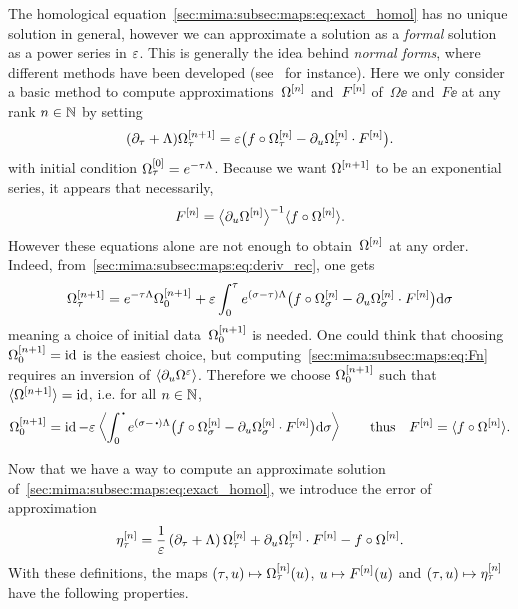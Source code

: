 The homological equation~\eqref{sec:mima:subsec:maps:eq:exact_homol} has 
no unique solution in general, however we can approximate a solution as a 
\textit{formal} solution as a power series in $\varepsilon$.
This is generally the idea behind \textit{normal forms}, where different 
methods have been developed (see~\cite{murdock.2006.normal} for instance). 
%
Here we only consider a basic method to compute approximations~$\Omega^{[n]}$ and~$F^{[n]}$ of~$\Omega\ee$ and~$F\ee$ at any rank $n \in \mathbb{N}$ by setting 
\begin{equation} \label{sec:mima:subsec:maps:eq:deriv_rec}
    (\partial_{\tau} + \Lambda) \Omega^{[n+1]}_{\tau} = \varepsilon \big( f\circ \Omega^{[n]}_{\tau} - \partial_{u} \Omega^{[n]}_{\tau} \cdot F^{[n]} \big) .
\end{equation}
with initial condition $\Omega^{[0]}_{\tau} = e^{-\tau \Lambda}$. 
%
Because we want $\Omega^{[n+1]}$ to be an exponential series, it appears that necessarily, 
\begin{equation} \label{sec:mima:subsec:maps:eq:Fn}
    F^{[n]} = \big\langle \partial_{u} \Omega^{[n]} \big\rangle ^{-1} 
    \langle f \circ \Omega^{[n]} \rangle .
\end{equation}
However these equations alone are not enough to obtain~$\Omega^{[n]}$ at any order. 
%
Indeed, from~\eqref{sec:mima:subsec:maps:eq:deriv_rec}, one gets 
\begin{equation} \label{sec:mima:subsec:maps:eq:rec}
    \Omega^{[n+1]}_{\tau} = e^{-\tau\Lambda} \Omega^{[n+1]}_0 
    + \varepsilon \int_0^{\tau} e^{(\sigma - \tau) \Lambda} \big( f\circ \Omega^{[n]}_{\sigma} - \partial_{u} \Omega^{[n]}_{\sigma} \cdot F^{[n]} \big) \mathrm{d}\sigma
\end{equation}
%
meaning a choice of initial data~$\Omega^{[n+1]}_0$ is needed. 
One could think that choosing $\Omega^{[n+1]}_0 = \operatorname{id}$ is the easiest choice, 
but computing~\eqref{sec:mima:subsec:maps:eq:Fn} requires an inversion of $\langle \partial_{u} \Omega^{\varepsilon} \rangle$. 
%
Therefore we choose $\Omega^{[n+1]}_0$ such that $\langle \Omega^{[n+1]} \rangle = \operatorname{id}$, 
i.e. for all $n \in \mathbb{N}$, 
\begin{equation} \label{sec:mima:subsec:maps:eq:Omega0}
  \Omega\rk{n+1}_0 = \id - \e \left\langle \int_0^{\,\bigcdot} e^{(\sigma - \,\bigcdot) \Lambda}
  \lp f\circ \Omega\rk{n}_{\sigma} - \dpu \Omega\rk{n}_{\sigma} \cdot F\rk{n} \rp \D\sigma \right\rangle
  \qquad\text{thus}\quad
  F\rk{n} = \langle f \circ \Omega\rk{n} \rangle . 
\end{equation}

Now that we have a way to compute an approximate solution 
of~\eqref{sec:mima:subsec:maps:eq:exact_homol}, 
we introduce the error of approximation
\begin{equation} \label{sec:mima:subsec:maps:eq:def_eta}
  \eta^{[n]}_{\tau} = 
  \frac{1}{\varepsilon}\left( \partial_{\tau} + \Lambda \right) \Omega^{[n]}_{\tau} + \partial_{u} \Omega^{[n]}_{\tau} \cdot F^{[n]} - f \circ \Omega^{[n]} . 
\end{equation}
With these definitions, the maps $(\tau,u) \mapsto \Omega^{[n]}_{\tau}(u)$, 
$u \mapsto F^{[n]}(u)$ and $(\tau, u) \mapsto \eta^{[n]}_{\tau}$ 
have the following properties. 


